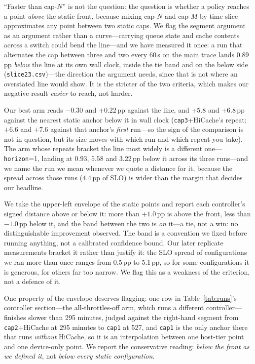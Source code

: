 ``Faster than cap-$N$'' is not the question: the question is whether a policy
reaches a point \emph{above} the static front, because mixing cap-$N$ and
cap-$M$ by time slice approximates any point between two static caps. We flag the segment argument as an argument rather than a curve---carrying
queue state and cache contents across a switch could bend the line---and we have
measured it once: a run that alternates the cap between three and two every 60\,s on
the main trace lands $0.89$\,pp \emph{below} the line at its own wall clock,
inside the tie band and on the below side (\texttt{slice23.csv})---the direction
the argument needs, since that is not where an overstated line would show. It is the stricter of the two criteria, which makes our negative result
\emph{easier} to reach, not harder.

Our best arm reads $-0.30$ and $+0.22$\,pp against the line, and $+5.8$ and
$+6.8$\,pp against the nearest static anchor below it in wall clock
(\texttt{cap3}+HiCache's repeat; $+6.6$ and $+7.6$ against that anchor's
\emph{first} run---so the sign of the comparison is not in question, but its
size moves with which run and which repeat you take). The arm whose repeats
bracket the line most widely is a different one---\texttt{horizon}=1, landing
at $0.93$, $5.58$ and $3.22$\,pp below it across its three runs---and we name
the run we mean whenever we quote a distance for it, because the spread across
those runs ($4.4$\,pp of SLO) is wider than the margin that decides our
headline.

We take the upper-left envelope of the static points and report each
controller's signed distance above or below it: more than $+1.0$\,pp is above
the front, less than $-1.0$\,pp below it, and the band between the two is
\emph{on} it---a tie, not a win: no distinguishable improvement observed. The
band is a convention we fixed before
running anything, not a calibrated confidence bound. Our later replicate measurements bracket it rather than
justify it: the SLO spread of configurations we ran more than once ranges from
0.5\,pp to 5.1\,pp, so for some configurations it is generous, for others far too
narrow. We flag this as a weakness of the criterion, not a
defence of it.

One property of the envelope deserves flagging: one row in
Table~\ref{tab:runs}'s controller section---the all-throttles-off arm, which
runs a different controller---finishes slower than 295 minutes, judged against the
right-hand segment from \texttt{cap2}+HiCache at 295 minutes to
\texttt{cap1} at 527, and \texttt{cap1} is the only anchor there that runs
\emph{without} HiCache, so it is an interpolation between one host-tier point
and one device-only point. We report the conservative
reading: \emph{below the front as we defined it}, not \emph{below every static
configuration}.

